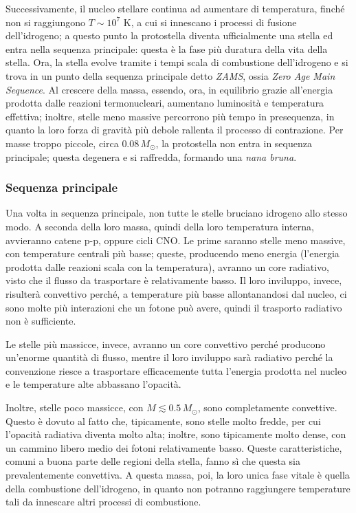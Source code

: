 \documentclass[11pt, a4paper]{scrartcl}
\theoremstyle{style}
\theoremstyle{style1}
\numberwithin{equation}{subsection}
\begin{document}
Successivamente, il nucleo stellare continua ad aumentare di temperatura, finch\'e non si raggiungono $ T\sim 10^7$ K, a cui si innescano i processi di fusione dell'idrogeno; a questo punto la protostella diventa ufficialmente una stella ed entra nella sequenza principale: questa \`e la fase pi\`u duratura della vita della stella.
Ora, la stella evolve tramite i tempi scala di combustione dell'idrogeno e si trova in un punto della sequenza principale detto \textit{ZAMS}, ossia \textit{Zero Age Main Sequence}.
Al crescere della massa, essendo, ora, in equilibrio grazie all'energia prodotta dalle reazioni termonucleari, aumentano luminosit\`a e temperatura effettiva; inoltre, stelle meno massive percorrono pi\`u tempo in presequenza, in quanto la loro forza di gravit\`a pi\`u debole rallenta il processo di contrazione.
Per masse troppo piccole, circa $0.08\, M_\odot $, la protostella non entra in sequenza principale; questa degenera e si raffredda, formando una \textit{nana bruna}.

\subsubsection{Sequenza principale}
Una volta in sequenza principale, non tutte le stelle bruciano idrogeno allo stesso modo. 
A seconda della loro massa, quindi della loro temperatura interna, avvieranno catene p-p, oppure cicli CNO.
Le prime saranno stelle meno massive, con temperature centrali pi\`u basse; queste, producendo meno energia (l'energia prodotta dalle reazioni scala con la temperatura), avranno un core radiativo, visto che il flusso da trasportare \`e relativamente basso.
Il loro inviluppo, invece, risulter\`a convettivo perch\'e, a temperature pi\`u basse allontanandosi dal nucleo, ci sono molte pi\`u interazioni che un fotone pu\`o avere, quindi il trasporto radiativo non \`e sufficiente.

Le stelle pi\`u massicce, invece, avranno un core convettivo perch\'e producono un'enorme quantit\`a di flusso, mentre il loro inviluppo sar\`a radiativo perch\'e la convenzione riesce a trasportare efficacemente tutta l'energia prodotta nel nucleo e le temperature alte abbassano l'opacit\`a.

Inoltre, stelle poco massicce, con $M \lesssim 0.5 \, M_\odot $, sono completamente convettive. 
Questo \`e dovuto al fatto che, tipicamente, sono stelle molto fredde, per cui l'opacit\`a radiativa diventa molto alta; inoltre, sono tipicamente molto dense, con un cammino libero medio dei fotoni relativamente basso.
Queste caratteristiche, comuni a buona parte delle regioni della stella, fanno s\`i che questa sia prevalentemente convettiva.
A questa massa, poi, la loro unica fase vitale \`e quella della combustione dell'idrogeno, in quanto non potranno raggiungere temperature tali da innescare altri processi di combustione.
\end{document}
